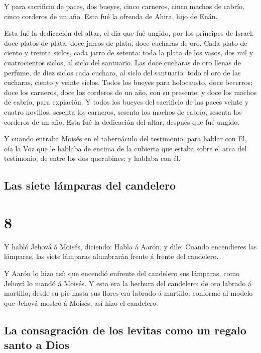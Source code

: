  Y para sacrificio de paces, dos bueyes, cinco carneros,
cinco machos de cabrío, cinco corderos de un año. Esta fué la ofrenda de
Ahira, hijo de Enán.

 Esta fué la dedicación del altar, el día que fué ungido,
por los príncipes de Israel: doce platos de plata, doce jarros de plata,
doce cucharas de oro.  Cada plato de ciento y treinta
siclos, cada jarro de setenta: toda la plata de los vasos, dos mil y
cuatrocientos siclos, al siclo del santuario.  Las doce
cucharas de oro llenas de perfume, de diez siclos cada cuchara, al siclo
del santuario: todo el oro de las cucharas, ciento y veinte siclos.
 Todos los bueyes para holocausto, doce becerros; doce los
carneros, doce los corderos de un año, con su presente: y doce los
machos de cabrío, para expiación.  Y todos los bueyes del
sacrificio de las paces veinte y cuatro novillos, sesenta los carneros,
sesenta los machos de cabrío, sesenta los corderos de un año. Esta fué
la dedicación del altar, después que fué ungido.

 Y cuando entraba Moisés en el tabernáculo del testimonio,
para hablar con El, oía la Voz que le hablaba de encima de la cubierta
que estaba sobre el arca del testimonio, de entre los dos querubines: y
hablaba con él.

\hypertarget{las-siete-luxe1mparas-del-candelero}{%
\subsection{Las siete lámparas del
candelero}\label{las-siete-luxe1mparas-del-candelero}}

\hypertarget{section-7}{%
\section{8}\label{section-7}}

 Y habló Jehová á Moisés, diciendo:  Habla á
Aarón, y dile: Cuando encendieres las lámparas, las siete lámparas
alumbrarán frente á frente del candelero.

 Y Aarón lo hizo así; que encendió enfrente del candelero
sus lámparas, como Jehová lo mandó á Moisés.  Y esta era la
hechura del candelero: de oro labrado á martillo; desde su pie hasta sus
flores era labrado á martillo: conforme al modelo que Jehová mostró á
Moisés, así hizo el candelero.

\hypertarget{la-consagraciuxf3n-de-los-levitas-como-un-regalo-santo-a-dios}{%
\subsection{La consagración de los levitas como un regalo santo a
Dios}\label{la-consagraciuxf3n-de-los-levitas-como-un-regalo-santo-a-dios}}

